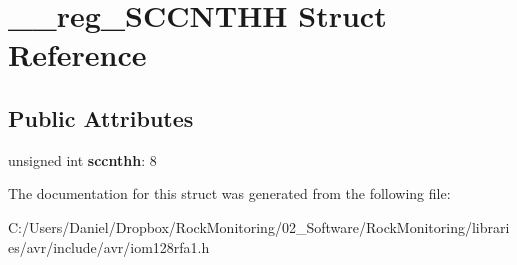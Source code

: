 \hypertarget{struct____reg___s_c_c_n_t_h_h}{}\section{\+\_\+\+\_\+reg\+\_\+\+S\+C\+C\+N\+T\+HH Struct Reference}
\label{struct____reg___s_c_c_n_t_h_h}
\subsection*{Public Attributes}
\begin{DoxyCompactItemize}
\item 
unsigned int {\bfseries sccnthh}\+: 8\hypertarget{struct____reg___s_c_c_n_t_h_h_a3b69ae9711a88df5c1dbf89cdc8133de}{}\label{struct____reg___s_c_c_n_t_h_h_a3b69ae9711a88df5c1dbf89cdc8133de}

\end{DoxyCompactItemize}


The documentation for this struct was generated from the following file\+:\begin{DoxyCompactItemize}
\item 
C\+:/\+Users/\+Daniel/\+Dropbox/\+Rock\+Monitoring/02\+\_\+\+Software/\+Rock\+Monitoring/libraries/avr/include/avr/iom128rfa1.\+h\end{DoxyCompactItemize}
